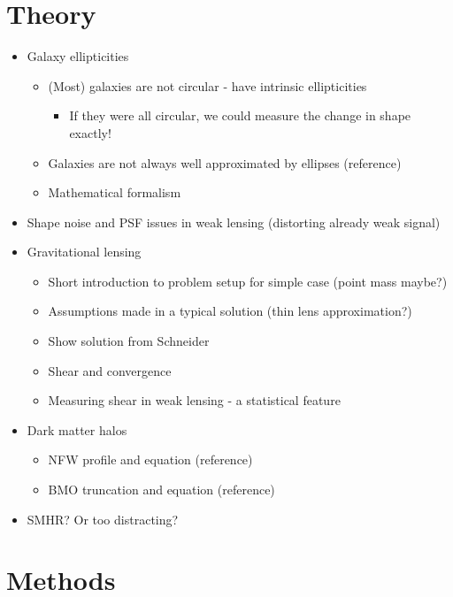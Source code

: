 \documentclass[%
 reprint,
 amsmath,amssymb,
 aps,
]{revtex4-1}
\begin{document}
\section{Theory}

\begin{itemize}
\item Galaxy ellipticities
    \begin{itemize}
    \item (Most) galaxies are not circular - have intrinsic ellipticities
        \begin{itemize}
        \item If they were all circular, we could measure the change in shape exactly!
        \end{itemize}
    \item Galaxies are not always well approximated by ellipses (reference)
    \item Mathematical formalism
    \end{itemize}
\item Shape noise and PSF issues in weak lensing (distorting already weak signal)
\item Gravitational lensing
    \begin{itemize}
    \item Short introduction to problem setup for simple case (point mass maybe?)
    \item Assumptions made in a typical solution (thin lens approximation?)
    \item Show solution from Schneider
    \item Shear and convergence 
    \item Measuring shear in weak lensing - a statistical feature
    \end{itemize}
\item Dark matter halos
    \begin{itemize}
    \item NFW profile and equation (reference)
    \item BMO truncation and equation (reference)
    \end{itemize}
\item SMHR? Or too distracting?
\end{itemize}

\section{Methods}
\end{document}
